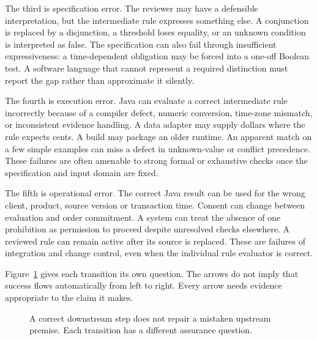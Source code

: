 The third is specification error. The reviewer may have a defensible
interpretation, but the intermediate rule expresses something else. A conjunction
is replaced by a disjunction, a threshold loses equality, or an unknown condition
is interpreted as false. The specification can also fail through insufficient
expressiveness: a time-dependent obligation may be forced into a one-off Boolean
test. A software language that cannot represent a required distinction must
report the gap rather than approximate it silently.

The fourth is execution error. Java can evaluate a correct intermediate rule
incorrectly because of a compiler defect, numeric conversion, time-zone mismatch,
or inconsistent evidence handling. A data adapter may supply dollars where the
rule expects cents. A build may package an older runtime. An apparent match on a
few simple examples can miss a defect in unknown-value or conflict precedence.
These failures are often amenable to strong formal or exhaustive checks once
the specification and input domain are fixed.

The fifth is operational error. The correct Java result can be used for the
wrong client, product, source version or transaction time. Consent can change
between evaluation and order commitment. A system can treat the absence of one
prohibition as permission to proceed despite unresolved checks elsewhere. A
reviewed rule can remain active after its source is replaced. These are failures
of integration and change control, even when the individual rule evaluator is
correct.

Figure~\ref{fig:assurance-chain} gives each transition its own question. The
arrows do not imply that success flows automatically from left to right. Every
arrow needs evidence appropriate to the claim it makes.

\begin{figure}[htbp]
\centering
{}
\caption{A correct downstream step does not repair a mistaken upstream premise.
Each transition has a different assurance question.}
\label{fig:assurance-chain}
\end{figure}

